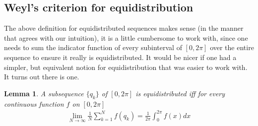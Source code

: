 \documentclass[12pt, titlepage]{article}
\newtheorem{lem}[thm]{Lemma}
\theoremstyle{definition}
\begin{document}
\subsection{Weyl's criterion for equidistribution}
The above definition for equidistributed sequences makes sense (in the manner that agrees with our intuition), it is a little cumbersome to work with, since one needs to sum the indicator function of every subinterval of $[0,2\pi]$ over the entire sequence to ensure it really is equidistributed. It would be nicer if one had a simpler, but equivalent notion for equidistribution that was easier to work with. It turns out there is one.

\begin{lem} \label{lem:1}
    A subsequence $\{q_k\}$ of $[0,2\pi]$ is equidistributed iff for every continuous function $f$ on $[0,2\pi]$
    \begin{align*}
        \lim\limits_{N \to \infty} \frac{1}{N} \sum_{k=1}^{N} f(q_k) = \frac{1}{2\pi} \int_{0}^{2\pi} f(x)dx
    \end{align*}
\end{lem}
\end{document}
